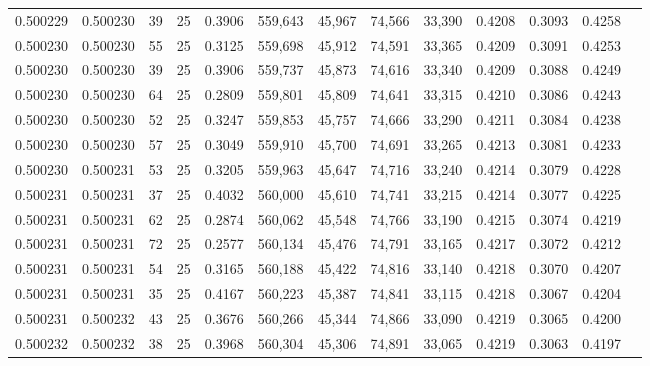 \begin{tabular}{rrrrrrrrrrrrr}
0.500229 & 0.500230 &    39 &  25 &                                     0.3906 & 559,643 &  45,967 &  74,566 &  33,390 & 0.4208 & 0.3093 & 0.4258 \\
0.500230 & 0.500230 &    55 &  25 &                                     0.3125 & 559,698 &  45,912 &  74,591 &  33,365 & 0.4209 & 0.3091 & 0.4253 \\
0.500230 & 0.500230 &    39 &  25 &                                     0.3906 & 559,737 &  45,873 &  74,616 &  33,340 & 0.4209 & 0.3088 & 0.4249 \\
0.500230 & 0.500230 &    64 &  25 &                                     0.2809 & 559,801 &  45,809 &  74,641 &  33,315 & 0.4210 & 0.3086 & 0.4243 \\
0.500230 & 0.500230 &    52 &  25 &                                     0.3247 & 559,853 &  45,757 &  74,666 &  33,290 & 0.4211 & 0.3084 & 0.4238 \\
0.500230 & 0.500230 &    57 &  25 &                                     0.3049 & 559,910 &  45,700 &  74,691 &  33,265 & 0.4213 & 0.3081 & 0.4233 \\
0.500230 & 0.500231 &    53 &  25 &                                     0.3205 & 559,963 &  45,647 &  74,716 &  33,240 & 0.4214 & 0.3079 & 0.4228 \\
0.500231 & 0.500231 &    37 &  25 &                                     0.4032 & 560,000 &  45,610 &  74,741 &  33,215 & 0.4214 & 0.3077 & 0.4225 \\
0.500231 & 0.500231 &    62 &  25 &                                     0.2874 & 560,062 &  45,548 &  74,766 &  33,190 & 0.4215 & 0.3074 & 0.4219 \\
0.500231 & 0.500231 &    72 &  25 &                                     0.2577 & 560,134 &  45,476 &  74,791 &  33,165 & 0.4217 & 0.3072 & 0.4212 \\
0.500231 & 0.500231 &    54 &  25 &                                     0.3165 & 560,188 &  45,422 &  74,816 &  33,140 & 0.4218 & 0.3070 & 0.4207 \\
0.500231 & 0.500231 &    35 &  25 &                                     0.4167 & 560,223 &  45,387 &  74,841 &  33,115 & 0.4218 & 0.3067 & 0.4204 \\
0.500231 & 0.500232 &    43 &  25 &                                     0.3676 & 560,266 &  45,344 &  74,866 &  33,090 & 0.4219 & 0.3065 & 0.4200 \\
0.500232 & 0.500232 &    38 &  25 &                                     0.3968 & 560,304 &  45,306 &  74,891 &  33,065 & 0.4219 & 0.3063 & 0.4197 \\

\end{tabular}
